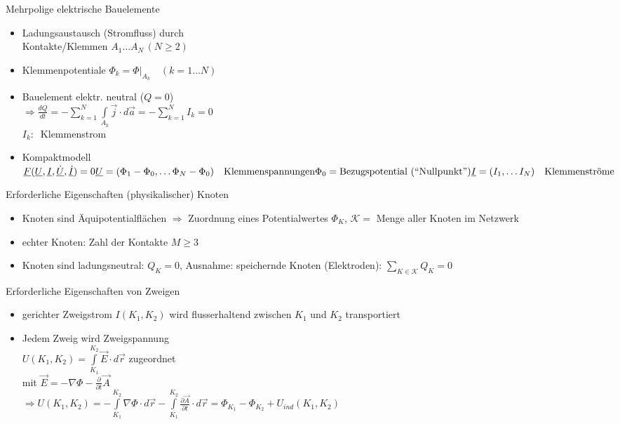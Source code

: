 \documentclass[a6paper]{kartei}
\begin{document}
\begin{karte}{Mehrpolige elektrische Bauelemente}
 \begin{itemize}
  \item Ladungsaustausch (Stromfluss) durch \\ Kontakte/Klemmen $A_{1} \dots A_{N} \, (N \geq 2)$
  \item Klemmenpotentiale $\Phi_{k} = \Phi|_{A_{k}} \quad (k = 1 \dots N)$
  \item Bauelement elektr. neutral ($Q = 0$) \\
  $\Rightarrow \frac{dQ}{dt} = - \sum \limits_{k=1}^{N} \int \limits_{A_{k}} \vec{j} \cdot d\vec{a} = - \sum \limits_{k=1}^{N} I_{k} = 0$ \\
  $I_{k}: \ $ Klemmenstrom
  \item Kompaktmodell $\underline{F}(\underline{U},\underline{I},\underline{\dot{U}},\underline{\dot{I}}) = 0
   \\\ \\\underline{U} =  (\Phi_{1} - \Phi_{0}, \dots \Phi_{N} - \Phi_{0}) \quad \text{Klemmenspannungen} \nonumber \\
   \Phi_{0} = \text{Bezugspotential (``Nullpunkt'')} \nonumber \\
   \underline{I} = (I_{1}, \dots I_{N}) \quad \text{Klemmenströme} \nonumber$

\end{itemize}
\end{karte}



\begin{karte}{Erforderliche Eigenschaften (physikalischer) Knoten}
\begin{itemize}
\item Knoten sind Äquipotentialflächen $\Rightarrow$ Zuordnung eines Potentialwertes $\Phi_{K}$, $\mathcal{K} = $ Menge aller Knoten im Netzwerk
\item echter Knoten: Zahl der Kontakte $M  \geq 3$
\item Knoten sind ladungsneutral: $Q_{K} = 0$, Ausnahme: speichernde Knoten (Elektroden): $\sum \limits_{K \in \mathcal{K}} Q_{K} = 0$
\end{itemize}
\end{karte}

\begin{karte}{Erforderliche Eigenschaften von Zweigen}
\begin{itemize}
\item gerichter Zweigstrom $I(K_{1},K_{2})$ wird flusserhaltend zwischen $K_{1}$ und $K_{2}$ transportiert
\item Jedem Zweig wird Zweigspannung \\ $U(K_{1},K_{2}) = \int \limits_{K_{1}}^{K_{2}} \vec{E} \cdot d\vec{r}$ zugeordnet \\
mit $  \vec{E} = - \nabla \Phi - \frac{\partial}{\partial t} \vec{A}$ \\
$\Rightarrow U(K_{1},K_{2}) = -\int \limits_{K_{1}}^{K_{2}} \nabla \Phi \cdot d\vec{r} - \int \limits_{K_{1}}^{K_{2}} \frac{\partial \vec{A}}{\partial t} \cdot d\vec{r} = \Phi_{K_{1}} - \Phi_{K_{2}} + U_{ind}(K_{1},K_{2}) $
\end{itemize}
\end{karte}
\end{document}
